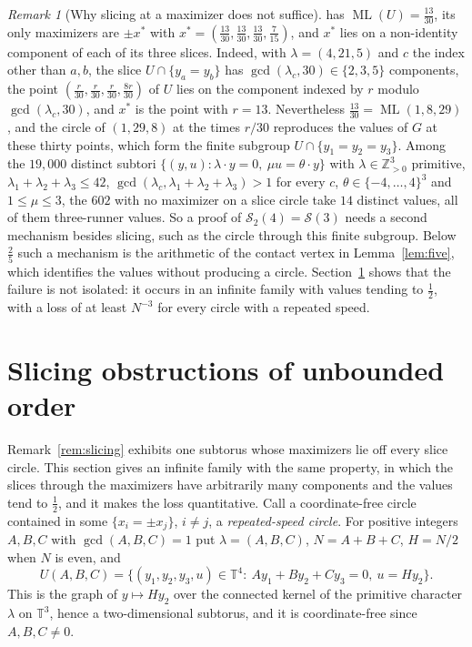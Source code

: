 \documentclass[12pt]{amsart}
\theoremstyle{definition}\newtheorem{definition}[theorem]{Definition}
\theoremstyle{remark}\newtheorem{remark}[theorem]{Remark}
\newcommand{\Z}{\mathbb Z}\newcommand{\R}{\mathbb R}\newcommand{\T}{\mathbb T}
\newcommand{\ML}{\operatorname{ML}}
\begin{document}
\begin{remark}[Why slicing at a maximizer does not suffice]
has $\ML(U)=\frac{13}{30}$, its only maximizers are $\pm x^*$ with $x^*=(\frac{13}{30},\frac{13}{30},\frac{13}{30},\frac7{15})$, and $x^*$ lies on a non-identity component of each of its three slices. Indeed, with $\lambda=(4,21,5)$ and $c$ the index other than $a,b$, the slice $U\cap\{y_a=y_b\}$ has $\gcd(\lambda_c,30)\in\{2,3,5\}$ components, the point $(\frac r{30},\frac r{30},\frac r{30},\frac{8r}{30})$ of $U$ lies on the component indexed by $r$ modulo $\gcd(\lambda_c,30)$, and $x^*$ is the point with $r=13$. Nevertheless $\frac{13}{30}=\ML(1,8,29)$, and the circle of $(1,29,8)$ at the times $r/30$ reproduces the values of $G$ at these thirty points, which form the finite subgroup $U\cap\{y_1=y_2=y_3\}$. Among the $19{,}000$ distinct subtori $\{(y,u):\lambda\cdot y=0,\ \mu u=\theta\cdot y\}$ with $\lambda\in\Z_{>0}^3$ primitive, $\lambda_1+\lambda_2+\lambda_3\le42$, $\gcd(\lambda_c,\lambda_1+\lambda_2+\lambda_3)>1$ for every $c$, $\theta\in\{-4,\dots,4\}^3$ and $1\le\mu\le3$, the $602$ with no maximizer on a slice circle take $14$ distinct values, all of them three-runner values. So a proof of $\mathcal S_2(4)=\mathcal S(3)$ needs a second mechanism besides slicing, such as the circle through this finite subgroup. Below $\frac25$ such a mechanism is the arithmetic of the contact vertex in Lemma~\ref{lem:five}, which identifies the values without producing a circle. Section~\ref{sec:obstr} shows that the failure is not isolated: it occurs in an infinite family with values tending to $\frac12$, with a loss of at least $N^{-3}$ for every circle with a repeated speed.
\end{remark}

\section{Slicing obstructions of unbounded order}\label{sec:obstr}
Remark~\ref{rem:slicing} exhibits one subtorus whose maximizers lie off every slice circle. This section gives an infinite family with the same property, in which the slices through the maximizers have arbitrarily many components and the values tend to $\frac12$, and it makes the loss quantitative. Call a coordinate-free circle contained in some $\{x_i=\pm x_j\}$, $i\ne j$, a \emph{repeated-speed circle}. For positive integers $A,B,C$ with $\gcd(A,B,C)=1$ put $\lambda=(A,B,C)$, $N=A+B+C$, $H=N/2$ when $N$ is even, and
\[
 U(A,B,C)=\{(y_1,y_2,y_3,u)\in\T^4:\ Ay_1+By_2+Cy_3=0,\ u=Hy_2\}.
\]
This is the graph of $y\mapsto Hy_2$ over the connected kernel of the primitive character $\lambda$ on $\T^3$, hence a two-dimensional subtorus, and it is coordinate-free since $A,B,C\ne0$.
\end{document}
